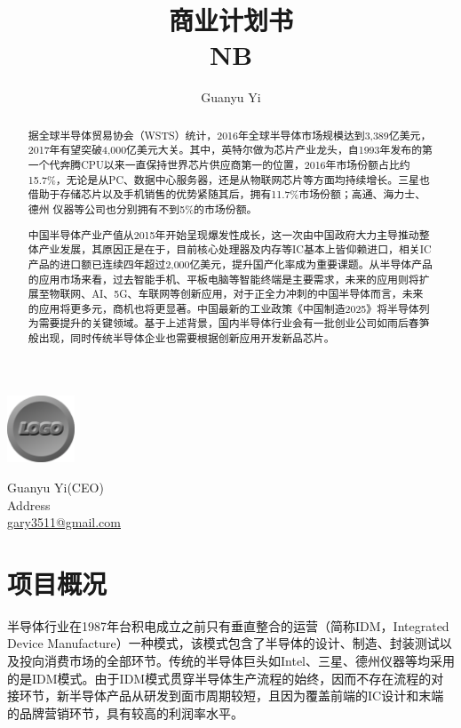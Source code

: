 \documentclass[a4paper,11pt]{article}
\title{\Huge{商业计划书}\\\LARGE{NB}}
\author{Guanyu Yi}
\begin{document}
\begin{titlepage}
  \centering
  \maketitle
  \thispagestyle{empty}   %
  \includegraphics[width=2cm]{images/logo.png}
  \vfill
  {\raggedright
    Guanyu Yi(CEO)\\
    Address\\
    \href{mailto:gary3511@gmail.com}{gary3511@gmail.com}\\
  }
\end{titlepage}

\renewcommand{\abstractname}{\LARGE{\textbf{摘\ 要}}}
\begin{abstract}
  据全球半导体贸易协会（WSTS）统计，2016年全球半导体市场规模达到3,389亿美元，2017年有望突破4,000亿美元大关。其中，英特尔做为芯片产业龙头，自1993年发布的第一个代奔腾CPU以来一直保持世界芯片供应商第一的位置，2016年市场份额占比约15.7\%，无论是从PC、数据中心服务器，还是从物联网芯片等方面均持续增长。三星也借助于存储芯片以及手机销售的优势紧随其后，拥有11.7\%市场份额；高通、海力士、德州 仪器等公司也分别拥有不到5\%的市场份额。
  
  中国半导体产业产值从2015年开始呈现爆发性成长，这一次由中国政府大力主导推动整体产业发展，其原因正是在于，目前核心处理器及内存等IC基本上皆仰赖进口，相关IC产品的进口额已连续四年超过2,000亿美元，提升国产化率成为重要课题。从半导体产品的应用市场来看，过去智能手机、平板电脑等智能终端是主要需求，未来的应用则将扩展至物联网、AI、5G、车联网等创新应用，对于正全力冲刺的中国半导体而言，未来的应用将更多元，商机也将更显著。中国最新的工业政策《中国制造2025》将半导体列为需要提升的关键领域。基于上述背景，国内半导体行业会有一批创业公司如雨后春笋般出现，同时传统半导体企业也需要根据创新应用开发新品芯片。
\end{abstract}
\pagebreak

\tableofcontents
\pagebreak

\section{项目概况}
半导体行业在1987年台积电成立之前只有垂直整合的运营（简称IDM，Integrated Device Manufacture）一种模式，该模式包含了半导体的设计、制造、封装测试以及投向消费市场的全部环节。传统的半导体巨头如Intel、三星、德州仪器等均采用的是IDM模式。由于IDM模式贯穿半导体生产流程的始终，因而不存在流程的对接环节，新半导体产品从研发到面市周期较短，且因为覆盖前端的IC设计和末端的品牌营销环节，具有较高的利润率水平。
\end{document}
